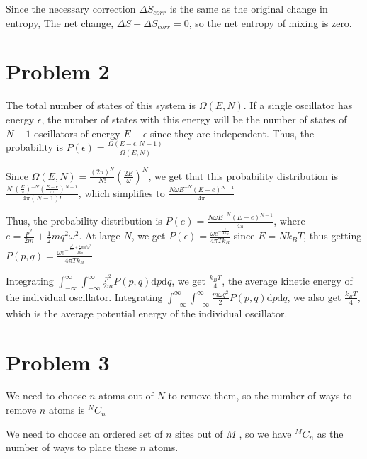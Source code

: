 \documentclass[12pt]{article}
\begin{document}
Since the necessary correction $\Delta S_{corr}$ is the same as the original change in entropy, The net change, $\Delta S - \Delta S_{corr} = 0$, so the net entropy of mixing is zero.

\section*{Problem 2}

The total number of states of this system is $\Omega(E,N)$. If a single oscillator has energy $\epsilon$, the number of states with this energy will be the number of states of $N-1$ oscillators of energy $E-\epsilon$ since they are independent. Thus, the probability is $P(\epsilon)=\frac{\Omega(E-\epsilon,N-1)}{\Omega(E,N)}$

Since $\Omega(E,N)=\frac{(2\pi)^N}{N!}\left(\frac{2E}{\omega}\right)^N$, we get that this probability distribution is $\frac{N! \left(\frac{E}{\omega }\right){}^{-N} \left(\frac{E-e}{\omega }\right){}^{N-1}}{4 \pi  (N-1)!}$, which simplifies to $\frac{N \omega  E^{-N} \left(E-e\right){}^{N-1}}{4 \pi }$

Thus, the probability distribution is $P(e) = \frac{N \omega  E^{-N} \left(E-e\right){}^{N-1}}{4 \pi }$, where $e = \frac{p^2}{2 m}+\frac{1}{2} m q^2 \omega ^2$. At large $N$, we get $P(\epsilon) = \frac{\omega  e^{-\frac{\epsilon}{T k_B}}}{4 \pi  T k_B}$ since $E=Nk_B T$, thus getting $\boxed{P(p,q) = \frac{\omega  e^{-\frac{\frac{p^2}{2 m}+\frac{1}{2} m q^2 \omega ^2}{T k_B}}}{4 \pi  T k_B}}$

Integrating $\int_{-\infty}^\infty\int_{-\infty}^\infty\frac{p^2}{2m} P(p,q)\mathrm dp\mathrm dq$, we get $\boxed{\frac{k_B T}{4}}$, the average kinetic energy of the individual oscillator. Integrating  $\int_{-\infty}^\infty\int_{-\infty}^\infty\frac{m\omega q^2}{2} P(p,q)\mathrm dp\mathrm dq$, we also get $\boxed{\frac{k_B T}{4}}$, which is the average potential energy of the individual oscillator.
\section*{Problem 3}

We need to choose $n$ atoms out of $N$ to remove them, so the number of ways to remove $n$ atoms is $\boxed{^NC_n}$

We need to choose an ordered set of $n$ sites out of $M$ , so we have $\boxed{^MC_n}$ as the number of ways to place these $n$ atoms.
\end{document}
